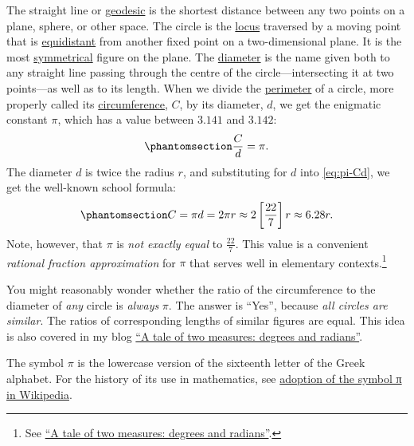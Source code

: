 \documentclass[
  a4paper,
]{article}
\begin{document}
The straight line or
\href{https://mathworld.wolfram.com/Geodesic.html}{geodesic} is the
shortest distance between any two points on a plane, sphere, or other
space. The circle is the
\href{https://en.wikipedia.org/wiki/Locus_(mathematics)}{locus}
traversed by a moving point that is
\href{https://en.wikipedia.org/wiki/Equidistant}{equidistant} from
another fixed point on a two-dimensional plane. It is the most
\href{https://mathworld.wolfram.com/Symmetry.html}{symmetrical} figure
on the plane. The
\href{https://en.wikipedia.org/wiki/Diameter}{diameter} is the name
given both to any straight line passing through the centre of the
circle---intersecting it at two points---as well as to its length. When
we divide the \href{https://en.wikipedia.org/wiki/Perimeter}{perimeter}
of a circle, more properly called its
\href{https://en.wikipedia.org/wiki/Circumference}{circumference},
\(C\), by its diameter, \(d\), we get the enigmatic constant \(\pi\),
which has a value between \(3.141\) and \(3.142\):
\begin{equation}\phantomsection\label{eq:pi-Cd}{
\frac{C}{d} = \pi.
}\end{equation} The diameter \(d\) is twice the radius \(r\), and
substituting for \(d\) into \cref{eq:pi-Cd}, we get the well-known
school formula: \begin{equation}\phantomsection\label{eq:two-pi-r}{
C = \pi d = 2\pi r \approx 2\left[\frac{22}{7}\right]r \approx 6.28r.
}\end{equation} Note, however, that \(\pi\) is \emph{not exactly equal}
to \(\frac{22}{7}\). This value is a convenient \emph{rational fraction
approximation} for \(\pi\) that serves well in elementary
contexts.\footnote{See
  \href{https://swanlotus.netlify.app/blogs/a-tale-of-two-measures-degrees-and-radians}{``A
  tale of two measures: degrees and radians''}.}

You might reasonably wonder whether the ratio of the circumference to
the diameter of \emph{any} circle is \emph{always} \(\pi\). The answer
is ``Yes'', because \emph{all circles are similar}. The ratios of
corresponding lengths of similar figures are equal. This idea is also
covered in my blog
\href{https://swanlotus.netlify.app/blogs/a-tale-of-two-measures-degrees-and-radians}{``A
tale of two measures: degrees and radians''}.

The symbol \href{https://en.wikipedia.org/wiki/Pi}{\(\pi\)} is the
lowercase version of the sixteenth letter of the Greek alphabet. For the
history of its use in mathematics, see
\href{https://en.wikipedia.org/wiki/Pi\#Adoption_of_the_symbol_\%CF\%80}{adoption
of the symbol π in Wikipedia}.
\end{document}
